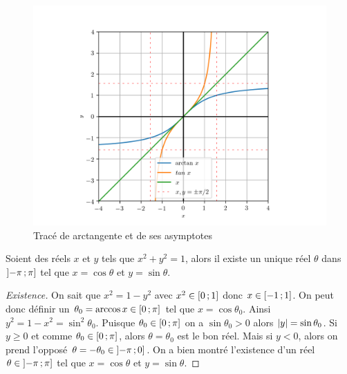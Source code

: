 \begin{figure}
  \centering
  \includegraphics[scale = 0.8]{arctan.png}
  \caption{Tracé de arctangente et de ses
  asymptotes}\label{fig:tracearctangente}
\end{figure}

\begin{theo}\label{chap1-theo:thetasin}
  Soient des réels \(x\) et \(y\) tels que \(x^2+y^2 = 1\), alors il existe un
  unique réel \(\theta\) dans \(\left] -\pi \, ; {} \pi \right]\) tel que \(x = \cos
  \theta\) et \(y = \sin \theta\).
\end{theo}

\begin{proof}[Existence]
  On sait que \(x^2 = 1-y^2\) avec \(x^2 \in \left[ 0 \, ; {} 1 \right]\) donc \(x \in
  \left[ -1 \, ; {} 1 \right]\). On peut donc définir un \(\theta_0 = \arccos x \in
  \left[ 0 \, ; {} \pi \right]\) tel que \(x = \cos \theta_0\). Ainsi \(y^2 = 1-x^2 =
  \sin^2 \theta_0\). Puisque \(\theta_0 \in \left[ 0 \, ; {} \pi \right]\) on a \(\sin
  \theta_0>0\) alors \(\left\lvert y\right\rvert = \sin \theta_0\).
  Si \(y \geqslant 0\) et comme \(\theta_0 \in \left[ 0 \, ; {} \pi \right]\), alors
  \(\theta = \theta_0\) est le bon réel.
  Mais si \(y<0\), alors on prend l'opposé \(\theta = -\theta_0 \in
  \left] -\pi \, ; {} 0 \right]\).
  On a bien montré l'existence d'un réel \(\theta \in
  \left] -\pi \, ; {} \pi \right]\) tel que \(x = \cos \theta\) et \(y = \sin
  \theta\).
\end{proof}

